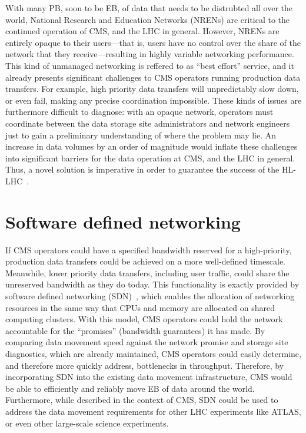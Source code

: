 With many PB, soon to be EB, of data that needs to be distrubted all over the world, National Research and Education Networks (NRENs) are critical to the continued operation of CMS, and the LHC in general. 
However, NRENs are entirely opaque to their users---that is, users have no control over the share of the network that they receive---resulting in highly variable networking performance. 
This kind of unmanaged networking is reffered to as ``best effort'' service, and it already presents significant challenges to CMS operators running production data transfers. 
For example, high priority data transfers will unpredictably slow down, or even fail, making any precise coordination impossible. 
These kinds of issues are furthermore difficult to diagnose: with an opaque network, operators must coordinate between the data storage site administrators and network engineers just to gain a preliminary understanding of where the problem may lie. 
An increase in data volumes by an order of magnitude would inflate these challenges into significant barriers for the data operation at CMS, and the LHC in general. 
Thus, a novel solution is imperative in order to guarantee the success of the HL-LHC~\cite{HEPSoftwareFoundation2017, Zurawski2021}. 

\section{Software defined networking}
If CMS operators could have a specified bandwidth reserved for a high-priority, production data transfers could be achieved on a more well-defined timescale. 
Meanwhile, lower priority data transfers, including user traffic, could share the unreserved bandwidth as they do today. 
This functionality is exactly provided by software defined networking (SDN)~\cite{SDNSurvey}, which enables the allocation of networking resources in the same way that CPUs and memory are allocated on shared computing clusters. 
With this model, CMS operators could hold the network accountable for the ``promises'' (bandwidth guarantees) it has made. 
By comparing data movement speed against the network promise and storage site diagnostics, which are already maintained, CMS operators could easily determine, and therefore more quickly address, bottlenecks in throughput. 
Therefore, by incorporating SDN into the existing data movement infrastructure, CMS would be able to efficiently and reliably move EB of data around the world. 
Furthermore, while described in the context of CMS, SDN could be used to address the data movement requirements for other LHC experiments like ATLAS, or even other large-scale science experiments. 

